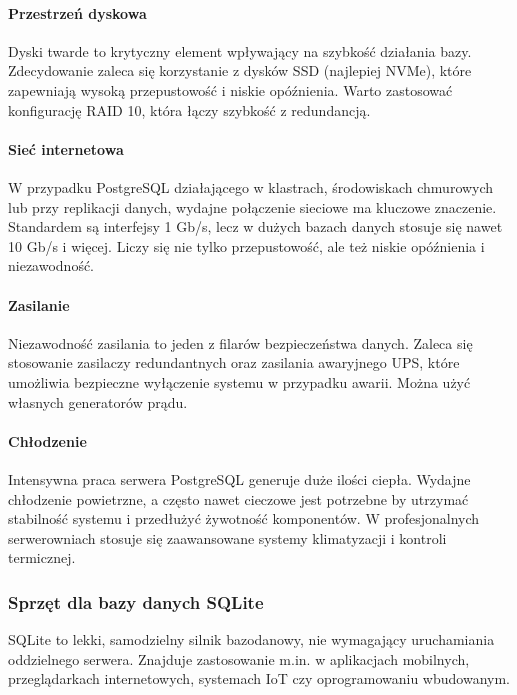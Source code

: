 \documentclass[letterpaper,10pt,polish]{sphinxmanual}
\begin{document}
\paragraph{Przestrzeń dyskowa}
\label{\detokenize{rozdzial2/Sprzet-dla-bazy-danych/source/SprzetDlaBazyDanych:przestrzen-dyskowa}}
\sphinxAtStartPar
Dyski twarde to krytyczny element wpływający na szybkość działania bazy. Zdecydowanie zaleca się korzystanie z dysków SSD (najlepiej NVMe), które zapewniają wysoką przepustowość i niskie opóźnienia. Warto zastosować konfigurację RAID 10, która łączy szybkość z redundancją.


\paragraph{Sieć internetowa}
\label{\detokenize{rozdzial2/Sprzet-dla-bazy-danych/source/SprzetDlaBazyDanych:siec-internetowa}}
\sphinxAtStartPar
W przypadku PostgreSQL działającego w klastrach, środowiskach chmurowych lub przy replikacji danych, wydajne połączenie sieciowe ma kluczowe znaczenie. Standardem są interfejsy 1 Gb/s, lecz w dużych bazach danych stosuje się nawet 10 Gb/s i więcej. Liczy się nie tylko przepustowość, ale też niskie opóźnienia i niezawodność.


\paragraph{Zasilanie}
\label{\detokenize{rozdzial2/Sprzet-dla-bazy-danych/source/SprzetDlaBazyDanych:zasilanie}}
\sphinxAtStartPar
Niezawodność zasilania to jeden z filarów bezpieczeństwa danych. Zaleca się stosowanie zasilaczy redundantnych oraz zasilania awaryjnego UPS, które umożliwia bezpieczne wyłączenie systemu w przypadku awarii. Można użyć własnych generatorów prądu.


\paragraph{Chłodzenie}
\label{\detokenize{rozdzial2/Sprzet-dla-bazy-danych/source/SprzetDlaBazyDanych:chlodzenie}}
\sphinxAtStartPar
Intensywna praca serwera PostgreSQL generuje duże ilości ciepła. Wydajne chłodzenie powietrzne, a często nawet cieczowe jest potrzebne by utrzymać stabilność systemu i przedłużyć żywotność komponentów. W profesjonalnych serwerowniach stosuje się zaawansowane systemy klimatyzacji i kontroli termicznej.


\subsubsection{Sprzęt dla bazy danych SQLite}
\label{\detokenize{rozdzial2/Sprzet-dla-bazy-danych/source/SprzetDlaBazyDanych:sprzet-dla-bazy-danych-sqlite}}
\sphinxAtStartPar
SQLite to lekki, samodzielny silnik bazodanowy, nie wymagający uruchamiania oddzielnego serwera. Znajduje zastosowanie m.in. w aplikacjach mobilnych, przeglądarkach internetowych, systemach IoT czy oprogramowaniu wbudowanym.
\end{document}
